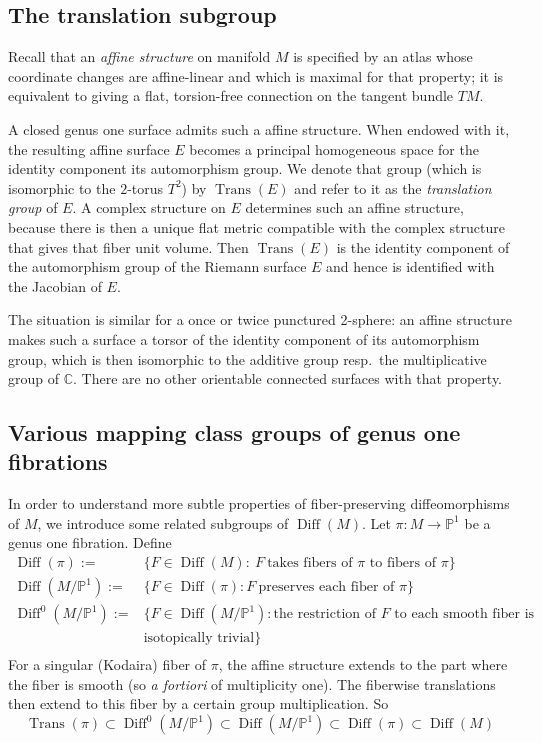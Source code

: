 \documentclass[10pt,letterpaper]{amsart}
\numberwithin{equation}{section}
\def\CC{{\mathbb C}}
\def\PP{{\mathbb P}}
\def\Pb{{\mathbb P}}
\newcommand\Diff{\operatorname{Diff}}
\newcommand\Trans{\operatorname{Trans}}
\theoremstyle{remark}
\begin{document}
\subsection{The translation subgroup}
\label{subsection:trans}
Recall that an {\em affine structure}  on manifold $M$ is specified by an atlas whose coordinate changes  are affine-linear and which is maximal for that property; it is equivalent to giving a flat, torsion-free connection on the 
tangent bundle $TM$.

A closed genus one surface admits such a affine structure. When endowed with it, the resulting affine surface $E$
becomes a principal homogeneous space for  the identity component  its automorphism group. 
We denote that group  (which is  isomorphic to the  $2$-torus $T^2$) by $\Trans(E)$ 
and refer to it as the \emph{translation group} of $E$. 
A  complex structure on $E$ determines such an affine structure, because there is then a unique flat 
metric compatible with the complex structure that gives that fiber unit volume. 
Then  $\Trans(E)$ is the  identity component of the automorphism group of the Riemann surface $E$ 
and hence is identified with  the Jacobian of $E$.

The situation is similar for a once or twice punctured 2-sphere: an affine structure 
makes such a surface a torsor of  the identity component  of its automorphism 
group, which is then isomorphic  to the additive group resp.\ the multiplicative group of 
$\CC$. There are no other orientable connected surfaces with that property.

\subsection{Various mapping class groups of genus one fibrations}
In order to understand more subtle properties of fiber-preserving diffeomorphisms of $M$, we introduce some related 
subgroups of $\Diff(M)$.  Let $\pi: M\to \PP^1$ be a genus one fibration. 
Define
\begin{align*}
\Diff(\pi):=&\{F\in\Diff(M): \ F \ \text{takes fibers of $\pi$ to fibers of $\pi$}\}\\
\Diff(M/\Pb^1):=&\{F\in\Diff(\pi): F \ \text{preserves each fiber of $\pi$}\}\\
\Diff^0(M/\Pb^1):=&\{F\in\Diff(M/\Pb^1): \text{the restriction of $F$ to each smooth fiber is}\\
&\text{isotopically trivial}\}\\
\end{align*}
For a singular (Kodaira)  fiber of $\pi$, the affine structure extends to the part  where the fiber is smooth (so \emph{a fortiori} of multiplicity  one). The fiberwise translations then extend to this fiber  by a certain group multiplication. So
\begin{equation}
\label{eq:sequence1}
\Trans(\pi)\subset \Diff^0(M/\Pb^1)\subset \Diff(M/\Pb^1)\subset\Diff(\pi)\subset\Diff(M)
\end{equation}
\end{document}
